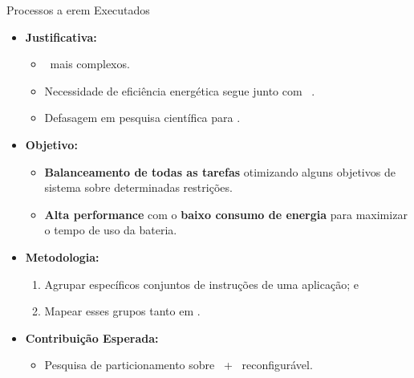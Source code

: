       \begin{frame}{Processos a erem Executados} \vspace{-0.8em}
         \begin{itemize} \setlength{\itemsep}{0.8em}
            \item \textbf{Justificativa:}
            \begin{itemize} \setlength{\itemsep}{0.3em}
               \item \Designs\ mais complexos.
               
               \item Necessidade de eficiência energética segue junto com \speedup\ \cite{Trindade2016, Arato2005, Yan2017}.
               
               \item Defasagem em pesquisa científica para \wearables.
               
            \end{itemize}
         
            \item \textbf{Objetivo:} 
            \begin{itemize} \setlength{\itemsep}{0.3em}
               \item \textbf{Balanceamento de todas as tarefas} otimizando alguns objetivos de sistema sobre determinadas restrições.
               
               \item \textbf{Alta performance} com o \textbf{baixo consumo de energia} para maximizar o tempo de uso da bateria.
            \end{itemize}
            \item \textbf{Metodologia:} 
            \begin{enumerate} \setlength{\itemsep}{0.3em}
               \item Agrupar específicos conjuntos de instruções de uma aplicação; e
               \item Mapear esses grupos tanto em \hs.
            \end{enumerate}
         
            \item \textbf{Contribuição Esperada:} 
            \begin{itemize} \setlength{\itemsep}{0.3em}
               \item Pesquisa de particionamento sobre \wearables\ + \hardware\ reconfigurável.
            \end{itemize}
         \end{itemize}
      \end{frame}
